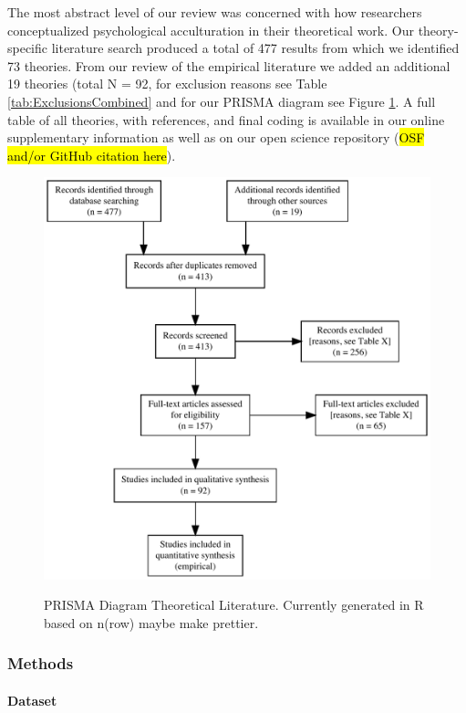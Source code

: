 The most abstract level of our review was concerned with how researchers
conceptualized psychological acculturation in their theoretical work.
Our theory-specific literature search produced a total of 477 results
from which we identified 73 theories. From our review of the empirical
literature we added an additional 19 theories (total N = 92, for
exclusion reasons see Table \ref{tab:ExclusionsCombined} and for our
PRISMA diagram see Figure \ref{fig:PRISMA_Theories}. A full table of all
theories, with references, and final coding is available in our online
supplementary information as well as on our open science repository
(\hl{OSF and/or GitHub citation here}).

\begin{figure}[h]
\centering
\caption{PRISMA Diagram Theoretical Literature. Currently generated in R based on n(row) maybe make prettier.}
\includegraphics[width=\textwidth]{Figures/PRISMA_Theories}
\label{fig:PRISMA_Theories}
\end{figure}



\subsubsection{Methods}
\paragraph{Dataset}

